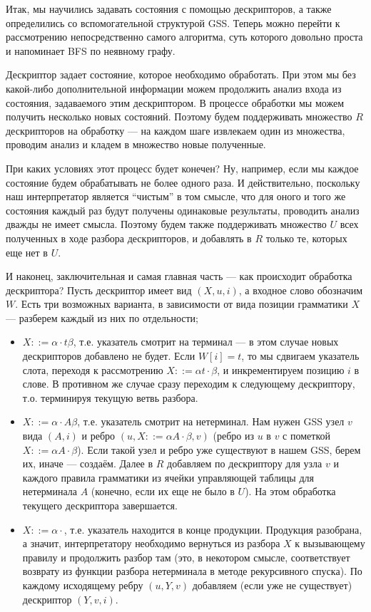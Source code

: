 Итак, мы научились задавать состояния с помощью дескрипторов, а также определились со вспомогательной структурой GSS. Теперь можно перейти к рассмотрению непосредственно самого алгоритма, суть которого довольно проста и напоминает BFS по неявному графу.

Дескриптор задает состояние, которое необходимо обработать. При этом мы без какой-либо дополнительной информации можем продолжить анализ входа из состояния, задаваемого этим дескриптором. В процессе обработки мы можем получить несколько новых состояний. Поэтому будем поддерживать множество $ R $ дескрипторов на обработку --- на каждом шаге извлекаем один из множества, проводим анализ и кладем в множество новые полученные. 

При каких условиях этот процесс будет конечен? Ну, например, если мы каждое состояние будем обрабатывать не более одного раза. И действительно, поскольку наш интерпретатор является ``чистым'' в том смысле, что для оного и того же состояния каждый раз будут получены одинаковые результаты, проводить анализ дважды не имеет смысла. Поэтому будем также поддерживать множество $ U $ всех полученных в ходе разбора дескрипторов, и добавлять в $ R $ только те, которых еще нет в $ U $.

И наконец, заключительная и самая главная часть --- как происходит обработка дескриптора?
Пусть дескриптор имеет вид $ (X, u, i) $, а входное слово обозначим $ W $. Есть три возможных варианта, в зависимости от вида позиции грамматики $ X $ --- разберем каждый из них по отдельности; 

\begin{itemize}
  \item $ X ::= \alpha \cdot t \beta $, т.е. указатель смотрит на терминал --- в этом случае новых дескрипторов добавлено не будет. Если $ W[i] = t $, то мы сдвигаем указатель слота, переходя к рассмотрению $ X ::= \alpha t \cdot \beta $, и инкрементируем позицию $ i $ в слове. В противном же случае сразу переходим к следующему дескриптору, т.о. терминируя текущую ветвь разбора.
  
  \item $ X ::= \alpha \cdot A \beta $, т.е. указатель смотрит на нетерминал. Нам нужен GSS узел $ v $ вида $ (A, i) $ и ребро $ (u, X ::= \alpha A \cdot \beta, v) $ (ребро из $ u $ в $ v $ с пометкой $ X ::= \alpha A \cdot \beta $). Если такой узел и ребро уже существуют в нашем GSS, берем их, иначе --- создаём. Далее в $ R $ добавляем по дескриптору для узла $ v $ и каждого правила грамматики из ячейки управляющей таблицы для нетерминала $ A $ (конечно, если их еще не было в $ U $). На этом обработка текущего дескриптора завершается.
  
  \item $ X ::= \alpha \cdot $, т.е. указатель находится в конце продукции. Продукция разобрана, а значит, интерпретатору необходимо вернуться из разбора $ X $ к вызывающему правилу и продолжить разбор там (это, в некотором смысле, соответствует возврату из функции разбора нетерминала в методе рекурсивного спуска). По каждому исходящему ребру $ (u, Y, v) $ добавляем (если уже не существует) дескриптор $(Y, v, i)$. 
\end{itemize}

